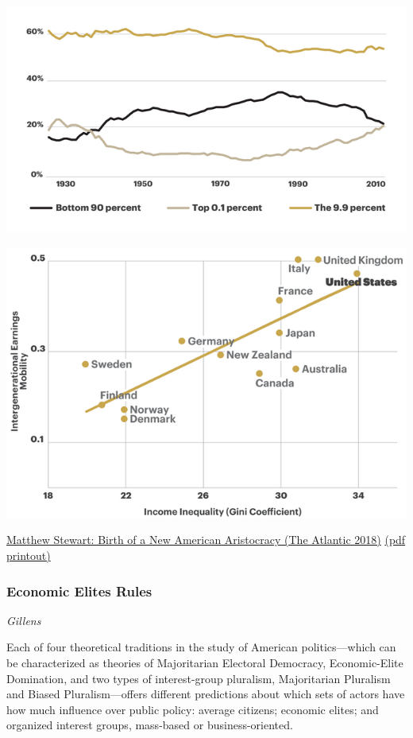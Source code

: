 \documentclass[
]{book}
\begin{document}
\includegraphics{fig/9p9.png}

\includegraphics{fig/gatsby.png}

\href{https://www.theatlantic.com/magazine/archive/2018/06/the-birth-of-a-new-american-aristocracy/559130/}{Matthew Stewart: Birth of a New American Aristocracy (The Atlantic 2018)}
\href{/pdf/Stewart_2019_Birth_of_New_Aristocracy.pdf}{(pdf printout)}

\hypertarget{economic-elites-rules}{%
\subsubsection{Economic Elites Rules}\label{economic-elites-rules}}

\emph{Gillens}

Each of four theoretical traditions in the study of American politics---which can be characterized as theories of Majoritarian Electoral Democracy, Economic-Elite Domination, and two types of interest-group pluralism, Majoritarian Pluralism and Biased Pluralism---offers different predictions about which sets of actors have how much influence over public policy: average citizens; economic elites; and organized interest groups, mass-based or business-oriented.
\end{document}
